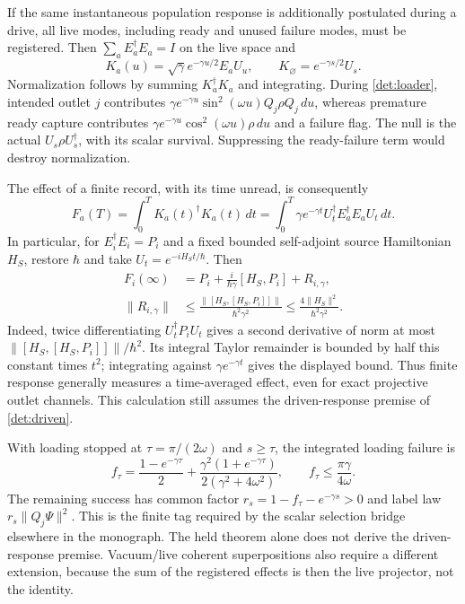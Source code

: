 \documentclass[11pt,oneside,openany]{book}
\theoremstyle{definition}
\theoremstyle{remark}\newtheorem{remark}[theorem]{Remark}
\begin{document}
If the same instantaneous population response is additionally
postulated during a drive, all live modes, including ready and unused
failure modes, must be registered. Then $\sum_aE_a^\dagger E_a=I$
on the live space and
\begin{equation}
 K_a(u)=\sqrt\gamma e^{-\gamma u/2}E_aU_u,
 \qquad K_{\varnothing}=e^{-\gamma s/2}U_s.       \label{det:driven}
\end{equation}
Normalization follows by summing $K_a^\dagger K_a$ and integrating.
During \eqref{det:loader}, intended outlet $j$ contributes
$\gamma e^{-\gamma u}\sin^2(\omega u)Q_j\rho Q_j\,du$,
whereas premature ready capture contributes
$\gamma e^{-\gamma u}\cos^2(\omega u)\rho\,du$ and a failure flag.
The null is the actual $U_s\rho U_s^\dagger$, with its scalar survival.
Suppressing the ready-failure term would destroy normalization.

The effect of a finite record, with its time unread, is consequently
\begin{equation}
 F_a(T)=\int_0^T K_a(t)^\dagger K_a(t)\,dt
       =\int_0^T\gamma e^{-\gamma t}
                    U_t^\dagger E_a^\dagger E_aU_t\,dt.
 \label{det:driven-effect}
\end{equation}
In particular, for $E_i^\dagger E_i=P_i$ and a fixed bounded
self-adjoint source Hamiltonian $H_S$, restore $\hbar$ and take
$U_t=e^{-iH_St/\hbar}$. Then
\begin{equation}
 \begin{aligned}
 F_i(\infty)&=P_i+\frac{i}{\hbar\gamma}[H_S,P_i]+R_{i,\gamma},\\
 \|R_{i,\gamma}\|&\le
 \frac{\|[H_S,[H_S,P_i]]\|}{\hbar^2\gamma^2}
 \le\frac{4\|H_S\|^2}{\hbar^2\gamma^2}.
 \end{aligned}
 \label{det:driven-effect-remainder}
\end{equation}
Indeed, twice differentiating $U_t^\dagger P_iU_t$ gives a second
derivative of norm at most
$\|[H_S,[H_S,P_i]]\|/\hbar^2$. Its integral Taylor remainder is
bounded by half this constant times $t^2$; integrating against
$\gamma e^{-\gamma t}$ gives the displayed bound. Thus finite response
generally measures a time-averaged effect, even for exact projective
outlet channels. This calculation still assumes the driven-response
premise of \eqref{det:driven}.

With loading stopped at $\tau=\pi/(2\omega)$ and $s\ge\tau$,
the integrated loading failure is
\[
 f_\tau=\frac{1-e^{-\gamma\tau}}2+
 \frac{\gamma^2(1+e^{-\gamma\tau})}{2(\gamma^2+4\omega^2)},
 \qquad f_\tau\le\frac{\pi\gamma}{4\omega}.
\]
The remaining success has common factor
$r_s=1-f_\tau-e^{-\gamma s}>0$ and label law
$r_s\|Q_j\Psi\|^2$. This is the finite tag required by the scalar
selection bridge elsewhere in the monograph. The held theorem alone
does not derive the driven-response premise. Vacuum/live coherent
superpositions also require a different extension, because the sum of
the registered effects is then the live projector, not the identity.
\end{document}
